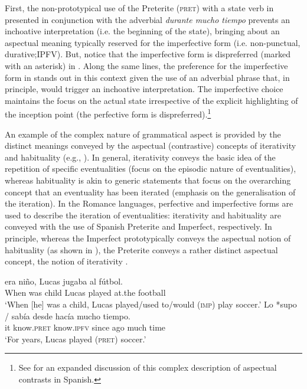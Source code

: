 \documentclass[output=paper,modfonts,nonflat,newtxmath]{langsci/langscibook}
\begin{document}
First, the non-prototypical use of the Preterite (\textsc{pret}) with a state verb in  presented in conjunction with the adverbial \textit{durante mucho tiempo} prevents an inchoative interpretation (i.e. the beginning of the state), bringing about an aspectual meaning typically reserved for the imperfective form (i.e. non-punctual, durative;IPFV). But, notice that the imperfective form is dispreferred (marked with an asterisk) in . Along the same lines, the preference for the imperfective form in  stands out in this context given the use of an adverbial phrase that, in principle, would trigger an inchoative interpretation. The imperfective choice maintains the focus on the actual state irrespective of the explicit highlighting of the inception point (the perfective form is dispreferred).\footnote{See \citet{Doiz2002} for an expanded discussion of this complex description of aspectual contrasts in Spanish.}

An example of the complex nature of grammatical aspect is provided by the distinct meanings conveyed by the aspectual (contrastive) concepts of iterativity and habituality (e.g., \citealt{deSwart1998, Langacker1999}). In general, iterativity conveys the basic idea of the repetition of specific eventualities (focus on the episodic nature of eventualities), whereas habituality is akin to generic statements that focus on the overarching concept that an eventuality has been iterated (emphasis on the generalisation of the iteration). In the Romance languages, perfective and imperfective forms are used to describe the iteration of eventualities: iterativity and habituality are conveyed with the use of Spanish Preterite and Imperfect, respectively. In principle, whereas the Imperfect prototypically conveys the aspectual notion of habituality (as shown in ), the Preterite conveys a rather distinct aspectual concept, the notion of iterativity .

\ea \label{ex:salaberry:2}
\begin{xlist}
\ex \label{ex:salaberry:2a}
 {era} {niño,} {Lucas} {jugaba} {al} {fútbol}.\\
When was child Lucas played at.the football \\
\glt  ‘When [he] was a child, Lucas played/used to/would (\textsc{imp}) play soccer.’
\ex \label{ex:salaberry:2b}
\gll Lo *supo  / sabía  desde hacía mucho tiempo.\\
it know.\textsc{pret} {} know.\textsc{ipfv} since ago much time\\
\glt ‘For years, Lucas played (\textsc{pret}) soccer.’
\end{xlist}
\z
\end{document}
